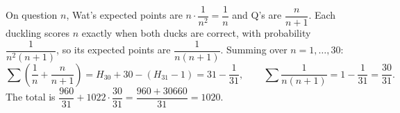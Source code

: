 On question $n$, Wat's expected points are $n\cdot\dfrac1{n^2}=\dfrac1n$ and Q's are $\dfrac n{n+1}$. Each duckling scores $n$ exactly when both ducks are correct, with probability $\dfrac1{n^2(n+1)}$, so its expected points are $\dfrac1{n(n+1)}$. Summing over $n=1,\dots,30$:
\[\sum\left(\dfrac1n+\dfrac n{n+1}\right)=H_{30}+30-(H_{31}-1)=31-\dfrac1{31},\qquad\sum\dfrac1{n(n+1)}=1-\dfrac1{31}=\dfrac{30}{31}.\]
The total is $\dfrac{960}{31}+1022\cdot\dfrac{30}{31}=\dfrac{960+30660}{31}=\boxed{1020}$.
